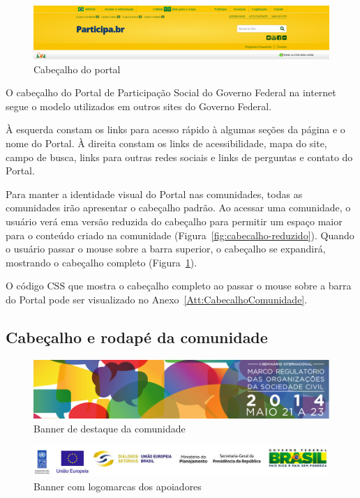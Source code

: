 \documentclass[[a4paper,11pt]{article}
\begin{document}
\begin{figure}[h]
\center
\includegraphics[scale=0.35]{cabecalho.png}
\caption{Cabeçalho do portal}
\label{fig:cabecalho}
\end{figure}

O cabeçalho do Portal de Participação Social do Governo Federal na internet
segue o modelo utilizados em outros sites do Governo Federal.

À esquerda constam os links para acesso rápido à algumas
seções da página e o nome do Portal.
À direita constam os links de acessibilidade, mapa do site, campo de
busca, links para outras redes sociais e links de perguntas e contato do
Portal.

Para manter a identidade visual do Portal nas comunidades, todas as comunidades
irão apresentar o cabeçalho padrão. Ao acessar uma comunidade, o usuário verá
ema versão reduzida do cabeçalho para permitir um espaço maior para o conteúdo
criado na comunidade (Figura~\ref{fig:cabecalho-reduzido}). Quando o usuário
passar o mouse sobre a barra superior, o cabeçalho se expandirá, mostrando o
cabeçalho completo (Figura~\ref{fig:cabecalho}).  

O código CSS que mostra o cabeçalho completo ao passar o mouse sobre a barra do Portal pode ser visualizado no
Anexo~\ref{Att:CabecalhoComunidade}.

\subsection{Cabeçalho e rodapé da comunidade}

\begin{figure}[h]
\center
\includegraphics[scale=0.5]{banner-destaque.png}
\caption{Banner de destaque da comunidade}
\label{fig:banner-destaque}
\end{figure}

\begin{figure}[h]
\center
\includegraphics[scale=0.5]{logos-apoiadores.png}
\caption{Banner com logomarcas dos apoiadores}
\label{fig:logos-apoiadores}
\end{figure}
\end{document}
